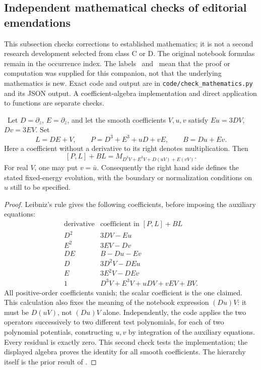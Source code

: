 \subsection{Independent mathematical checks of editorial emendations}
\label{checks:1985}

This subsection checks corrections to established mathematics; it is not a second
research development selected from class C or D. The original notebook formulas
remain in the occurrence index. The labels \ours\ and \oursComputed\ mean that
the proof or computation was supplied for this companion, not that the underlying
mathematics is new. Exact code and output are in
\texttt{code/check\_mathematics.py} and its JSON output. A coefficient-algebra
implementation and direct application to functions are separate checks.

\begin{proposition}\ours\
Let \(D=\partial_z\), \(E=\partial_{\bar z}\), and let the smooth coefficients
\(V,u,v\) satisfy \(Eu=3DV\), \(Dv=3EV\). Set
\[
 L=DE+V,\qquad P=D^3+E^3+uD+vE,\qquad B=Du+Ev.
\]
Here a coefficient without a derivative to its right denotes multiplication.
Then
\[
 [P,L]+BL=M_{D^3V+E^3V+D(uV)+E(vV)}.
\]
For real \(V\), one may put \(v=\bar u\). Consequently the right hand side
defines the stated fixed-energy evolution, with the boundary or normalization
conditions on \(u\) still to be specified.
\end{proposition}
\begin{proof}
Leibniz's rule gives the following coefficients, before imposing the auxiliary
equations:
\[
\begin{array}{c|l}
\text{derivative} & \text{coefficient in }[P,L]+BL\\\hline
D^2&3DV-Eu\\
E^2&3EV-Dv\\
DE&B-Du-Ev\\
D&3D^2V-DEu\\
E&3E^2V-DEv\\
1&D^3V+E^3V+uDV+vEV+BV.
\end{array}
\]
All positive-order coefficients vanish; the scalar coefficient is the one
claimed. This calculation also fixes the meaning of the notebook expression
\((D u)V\): it must be \(D(uV)\), not \((Du)V\) alone. Independently, the code
applies the two operators successively to two different test polynomials, for
each of two polynomial potentials, constructing \(u,v\) by integration of the
auxiliary equations. Every residual is exactly zero. This second check tests the
implementation; the displayed algebra proves the identity for all smooth
coefficients. The hierarchy itself is the prior result of
\citet[\S II, equations (4)--(6)]{veselovnovikov1984explicit}.
\end{proof}

